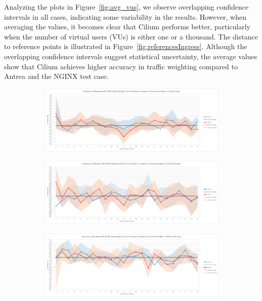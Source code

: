 Analyzing the plots in Figure~\ref{fig:avg_vus}, we observe overlapping confidence intervals in all cases, indicating some variability in the results. However, when averaging the values, it becomes clear that Cilium performs better, particularly when the number of virtual users (VUs) is either one or a thousand. The distance to reference points is illustrated in Figure~\ref{fig:referencesIngress}. Although the overlapping confidence intervals suggest statistical uncertainty, the average values show that Cilium achieves higher accuracy in traffic weighting compared to Antrea and the NGINX test case.


\begin{figure}[H]
    \centering
    \begin{subfigure}[b]{0.8\textwidth}
        \includegraphics[width=\textwidth]{plots/traffic-splitting/time_window_5_1vu_cloud.png}
        \label{fig:time_window_1vu}
    \end{subfigure}

    \vspace{-0.1cm}

    \begin{subfigure}[b]{0.8\textwidth}
        \includegraphics[width=\textwidth]{plots/traffic-splitting/time_window_5_10vu_cloud.png}
        \label{fig:time_window_10vu}
    \end{subfigure}

    \vspace{-0.1cm}

    \begin{subfigure}[b]{0.8\textwidth}
        \includegraphics[width=\textwidth]{plots/traffic-splitting/time_window_5_100vu_cloud.png}
        \label{fig:time_window_100vu}
    \end{subfigure}


\end{figure}
